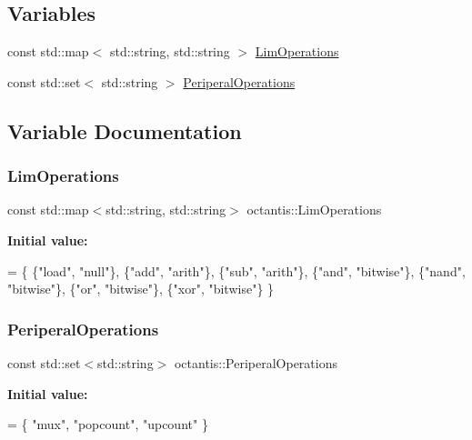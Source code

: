 \subsection*{Variables}
\begin{DoxyCompactItemize}
\item 
const std\+::map$<$ std\+::string, std\+::string $>$ \hyperlink{namespaceoctantis_a49f0001417908900d6959ac7a8037ebd}{Lim\+Operations}
\item 
const std\+::set$<$ std\+::string $>$ \hyperlink{namespaceoctantis_adec74f4b9921d5c7eecef4f9174c3510}{Periperal\+Operations}
\end{DoxyCompactItemize}


\subsection{Variable Documentation}
\mbox{\label{namespaceoctantis_a49f0001417908900d6959ac7a8037ebd}} 
\subsubsection{\texorpdfstring{Lim\+Operations}{LimOperations}}
{\footnotesize\ttfamily const std\+::map$<$std\+::string, std\+::string$>$ octantis\+::\+Lim\+Operations}

{\bfseries Initial value\+:}
\begin{DoxyCode}
= \{
    \{\textcolor{stringliteral}{"load"}, \textcolor{stringliteral}{"null"}\},
    \{\textcolor{stringliteral}{"add"}, \textcolor{stringliteral}{"arith"}\},
    \{\textcolor{stringliteral}{"sub"}, \textcolor{stringliteral}{"arith"}\},
    \{\textcolor{stringliteral}{"and"}, \textcolor{stringliteral}{"bitwise"}\},
    \{\textcolor{stringliteral}{"nand"}, \textcolor{stringliteral}{"bitwise"}\},
    \{\textcolor{stringliteral}{"or"}, \textcolor{stringliteral}{"bitwise"}\},
    \{\textcolor{stringliteral}{"xor"}, \textcolor{stringliteral}{"bitwise"}\}
\}
\end{DoxyCode}
\mbox{\label{namespaceoctantis_adec74f4b9921d5c7eecef4f9174c3510}} 
\subsubsection{\texorpdfstring{Periperal\+Operations}{PeriperalOperations}}
{\footnotesize\ttfamily const std\+::set$<$std\+::string$>$ octantis\+::\+Periperal\+Operations}

{\bfseries Initial value\+:}
\begin{DoxyCode}
= \{
    \textcolor{stringliteral}{"mux"},
    \textcolor{stringliteral}{"popcount"},
    \textcolor{stringliteral}{"upcount"}
\}
\end{DoxyCode}
